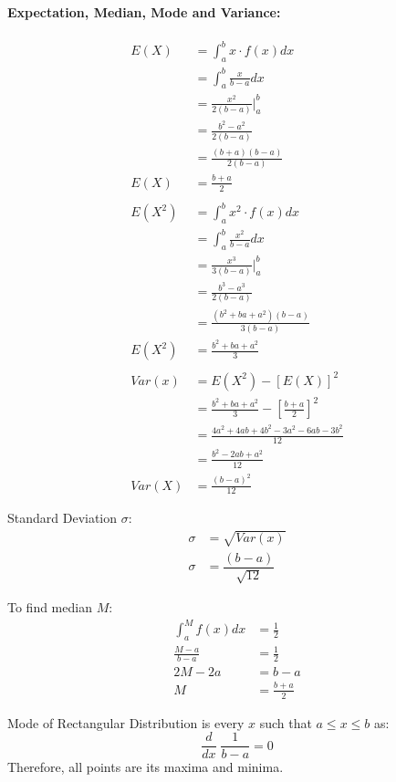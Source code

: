 \documentclass[
10pt, %
a4paper, %
]{report}
\begin{document}
\paragraph*{Expectation, Median, Mode and Variance:}
\begin{align*}
    E(X) &= \int_a^b x \cdot f(x) dx \\
         &= \int_a^b \frac{x}{b-a} dx \\
         &= \frac{x^2}{2(b-a)} \Biggr|_a^b \\
         &= \frac{b^2-a^2}{2(b-a)} \\
         &= \frac{(b+a)(b-a)}{2(b-a)} \\
    E(X) &= \frac{b+a}{2} \\ \\
    E(X^2) &= \int_a^b x^2 \cdot f(x) dx \\
           &= \int_a^b \frac{x^2}{b-a} dx \\
           &= \frac{x^3}{3(b-a)} \Biggr|_a^b \\
           &= \frac{b^3-a^3}{2(b-a)} \\
           &= \frac{(b^2+ba+a^2)(b-a)}{3(b-a)} \\
    E(X^2) &= \frac{b^2+ba+a^2}{3}  \\ \\
    Var(x) &= E(X^2) - [E(X)]^2 \\
           &= \frac{b^2+ba+a^2}{3} - \left[\frac{b+a}{2}\right]^2 \\
           &= \frac{4a^2+4ab+4b^2-3a^2-6ab-3b^2}{12} \\
           &= \frac{b^2-2ab+a^2}{12} \\
    Var(X) &= \frac{(b-a)^2}{12}
\end{align*}

Standard Deviation \(\sigma\):
\begin{align*}
    \sigma &= \sqrt{Var(x)} \\
    \sigma &= \dfrac{(b-a)}{\sqrt{12}}
\end{align*}

To find median \(M\):
\begin{align*}
    \int_a^M f(x) dx &= \frac{1}{2} \\
    \frac{M-a}{b-a} &= \frac{1}{2} \\
    2M-2a &= b-a \\
    M &= \frac{b+a}{2}
\end{align*}


Mode of Rectangular Distribution is every \(x\) such that \(a\leq x \leq b\) as:
\[
\frac{d}{dx}\;\frac{1}{b-a}=0
\]
Therefore, all points are its maxima and minima.
\end{document}
